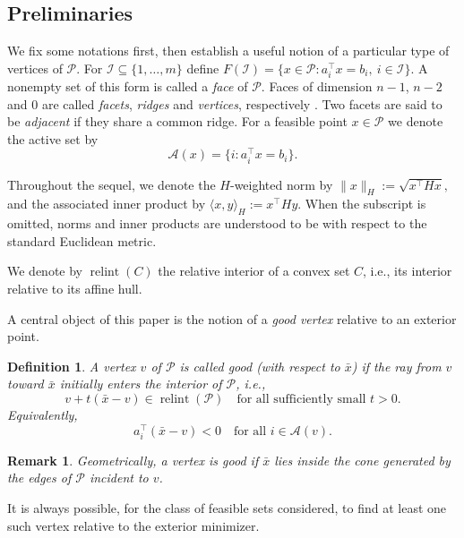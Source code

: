 \documentclass[pdflatex,sn-mathphys-num]{sn-jnl}%
\theoremstyle{thmstyleone}%
\theoremstyle{thmstyletwo}%
\newtheorem{remark}{Remark}%
\theoremstyle{thmstylethree}%
\theoremstyle{thmstylethree}%
\newtheorem{definition}{Definition}%
\DeclareMathOperator{\relint}{relint}
\newcommand{\Pset}{\mathcal{P}}
\begin{document}
 

\subsection{Preliminaries}\label{sec:preliminaries}
We fix some notations first, then establish a useful notion of a particular type of vertices of $\Pset$. For $\mathcal I\subseteq\{1,\dots,m\}$ define
$
F(\mathcal I)
=
\{x\in\mathcal P : a_i^\top x=b_i,\ i\in\mathcal I\}.
$ 
A nonempty set of this form is called a \emph{face} of $\mathcal P$.
Faces of dimension $n-1$, $n-2$ and $0$ are called \emph{facets}, \emph{ridges} and \emph{vertices}, respectively \cite{polytopes, conv_book_2}. Two facets are said to be \emph{adjacent} if they share a common ridge. For a feasible point $x\in\mathcal P$ we denote the active set by
\[
\mathcal A(x)=\{i: a_i^\top x=b_i\}.
\]

Throughout the sequel, we denote the $H$-weighted norm by
$
\|x\|_H := \sqrt{x^\top H x},
$
and the associated inner product by
$
\langle x, y\rangle_H := x^\top H y.
$
When the subscript is omitted, norms and inner products are understood to be with respect to the standard Euclidean metric. 


We denote by $\relint(C)$ the relative interior of a convex set $C$, i.e., its interior relative to its affine hull.

A central object of this paper is the notion of a \emph{good vertex} relative to an exterior point.

\begin{definition}\label{def:good_vertex}
A vertex $v$ of $\mathcal{P}$ is called
\emph{good} (with respect to $\bar{x}$) if the ray from $v$ toward $\bar{x}$
initially enters the interior of $\mathcal{P}$, i.e.,
\[
v + t(\bar{x}-v) \in \relint(\mathcal P)
\quad \text{for all sufficiently small } t>0 .
\]
Equivalently,
\[
a_i^\top(\bar{x}-v) < 0
\quad \text{for all } i \in \mathcal A(v).
\]
\end{definition}

\begin{remark}
Geometrically, a vertex is good if $\bar{x}$ lies inside the cone generated
by the edges of $\mathcal P$ incident to $v$.
\end{remark}

It is always possible, for the class of feasible sets considered, to find at least one such vertex relative to the exterior minimizer.
\end{document}
